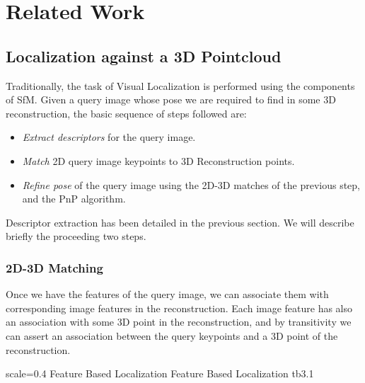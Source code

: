 

\chapter{Related Work}
\section{Localization against a 3D Pointcloud}
Traditionally, the task of Visual Localization is performed using the components of SfM. Given a query image whose pose we are required to find in some 3D reconstruction, the basic sequence of steps followed are:

\begin{itemize}
	\item \emph{Extract descriptors} for the query image.\\
	\item \textit{Match} 2D query image keypoints to 3D Reconstruction points.\\
	\item \textit{Refine pose} of the query image using the 2D-3D matches of the previous step, and the PnP algorithm.\\
\end{itemize}

Descriptor extraction has been detailed in the previous section. We will describe briefly the proceeding two steps. 

\subsection{2D-3D Matching}
Once we have the features of the query image, we can associate them with corresponding image features in the reconstruction. Each image feature has also an association with some 3D point in the reconstruction, and by transitivity we can assert an association between the query keypoints and a 3D point of the reconstruction.

{scale=0.4}%
{Feature Based Localization}%
{Feature Based Localization}%
{tb3.1} %


